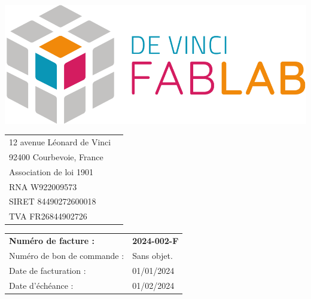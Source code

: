 \documentclass[11pt,a4paper]{article}
\begin{document}
\thispagestyle{empty}


\begin{minipage}{0.4\textwidth}
    \includegraphics[width=0.7\linewidth]{../../assets/logo_fablab.png}

    \vspace{0.5cm}

    \begin{tabular}{ll}
        12 avenue Léonard de Vinci \\
        92400 Courbevoie, France   \\
        Association de loi 1901    \\
        RNA W922009573             \\
        SIRET 84490272600018       \\
        TVA  FR26844902726         \\
    \end{tabular}
\end{minipage}\begin{minipage}{0.6\textwidth}
    \begin{flushright}
        \begin{tabular}{ll}
            \textbf{Numéro de facture :} & \textbf{2024-002-F} \\
            Numéro de bon de commande :  & Sans objet.         \\
            Date de facturation :        & 01/01/2024          \\
            Date d'échéance :            & 01/02/2024          \\
        \end{tabular}
    \end{flushright}
\end{minipage}
\end{document}
